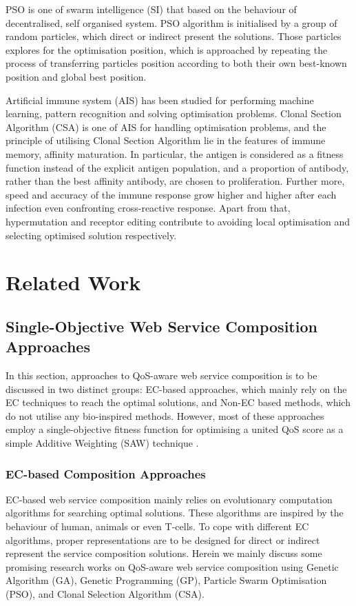 PSO is one of swarm intelligence (SI) that based on the behaviour of decentralised, self organised system. PSO algorithm is initialised by a group of random particles, which direct or indirect present the solutions. Those particles explores for the optimisation position, which is approached by repeating the process of transferring particles position according to both their own best-known position and global best position.

Artificial immune system (AIS) has been studied for performing machine learning, pattern recognition and solving optimisation problems.  Clonal Section Algorithm (CSA) is one of AIS for handling optimisation problems, and the principle of utilising Clonal Section Algorithm lie in the features of immune memory, affinity maturation. In particular, the antigen is considered as a fitness function instead of the explicit antigen population, and a proportion of antibody, rather than the best affinity antibody, are chosen to proliferation. Further more, speed and accuracy of the immune response grow higher and higher after each infection even confronting cross-reactive response. Apart from that, hypermutation and receptor editing contribute to avoiding local optimisation and selecting optimised solution respectively. 


\section{Related Work}\label{related}

\subsection{Single-Objective Web Service Composition Approaches}\label{singleobjective}

In this section, approaches to QoS-aware web service composition is to be discussed in two distinct groups: EC-based approaches, which mainly rely on the EC techniques to reach the optimal solutions, and Non-EC based methods, which do not utilise any bio-inspired methods. However, most of these approaches employ a single-objective fitness function for optimising a united QoS score as a simple Additive Weighting (SAW) technique \cite{hwang1981lecture}.
\subsubsection{EC-based Composition Approaches}
EC-based web service composition mainly relies on evolutionary computation algorithms for searching optimal solutions. These algorithms are inspired by the behaviour of human, animals or even T-cells.  To cope with different EC algorithms, proper representations are to be designed for direct or indirect represent the service composition solutions. Herein we mainly discuss some promising research works on QoS-aware web service composition using  Genetic Algorithm (GA), Genetic Programming (GP), Particle Swarm Optimisation (PSO), and Clonal Selection Algorithm (CSA).

